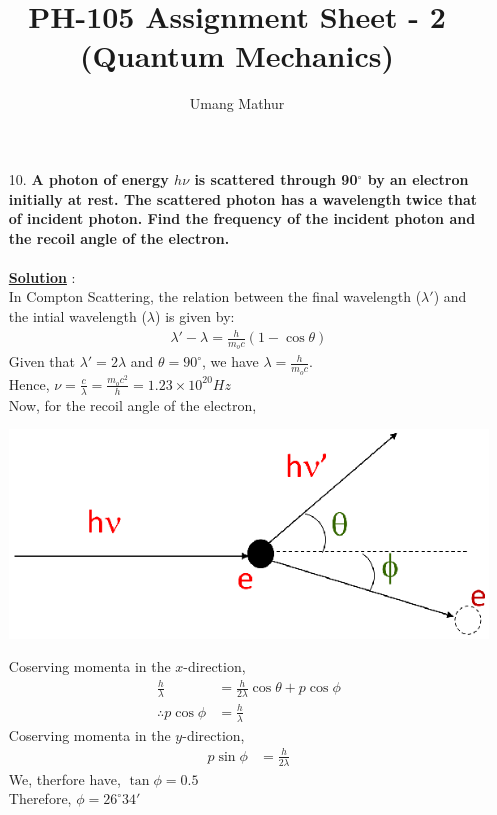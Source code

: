 \documentclass[10pt, a4paper]{article}
\begin{document}
	\title{PH-105 Assignment Sheet - 2 (Quantum Mechanics)}
	\date{}
	\author{Umang Mathur}
	\maketitle
	\begin{enumerate}
		\item[10.] {\bf A photon of energy $h\nu$ is scattered through 90$^{\circ}$ by an electron initially at rest. The scattered photon has a wavelength twice that of incident photon. Find the frequency of the incident photon and the recoil angle of the electron.}\\\\
		{\underline {\bf Solution}} :\\
		
		In Compton Scattering, the relation between the final wavelength ($\lambda'$) and the intial wavelength ($\lambda$) is given by:
		\begin{align*}
			\lambda' - \lambda = \frac{h}{m_{o}c}(1-\cos\theta)
		\end{align*}
		Given that $\lambda' = 2\lambda$ and $\theta = 90^{\circ}$, we have $\lambda = \frac{h}{m_{o}c}$.\\
		Hence, $\nu = \frac{c}{\lambda} = \frac{m_{o}c^{2}}{h} = 1.23\times10^{20} Hz$\\
		
		Now, for the recoil angle of the electron,
		
		\includegraphics{compton}
		
		Coserving momenta in the $x$-direction,
		\begin{align*}
			\frac{h}{\lambda} &= \frac{h}{2\lambda}\cos\theta + p\cos\phi \\
			\therefore p\cos\phi &= \frac{h}{\lambda}
		\end{align*}
		Coserving momenta in the $y$-direction,
		\begin{align*}
			p\sin\phi &= \frac{h}{2\lambda}
		\end{align*}
		We, therfore have, $\tan\phi = 0.5$\\
		Therefore, $\phi = 26^{\circ}34'$
	\end{enumerate}
\end{document}
